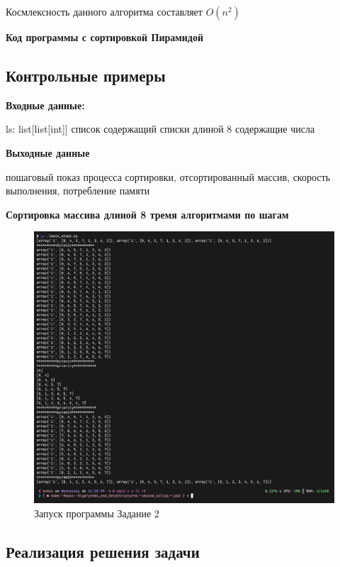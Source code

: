 Космлексность данного алгоритма составляет $O(n^2)$


\textbf{Код программы с сортировкой Пирамидой}




\subsection{Контрольные примеры}
\textbf{Входные данные:}

ls: list[list[int]] список содержащий списки длиной 8 содержащие числа

\textbf{Выходные данные}

пошаговый показ процесса сортировки, отсортированный массив, скорость выполнения, потребление памяти

\begin{centering}
    \textbf{Сортировка массива длиной 8 тремя алгоритмами по шагам}
\end{centering}

\begin{figure}[H]
    \centering
    \includegraphics[width=1\textwidth]{./flowcharts/main_steps.png}
    \caption{Запуск программы Задание 2}
\end{figure}



\subsection{Реализация решения задачи}

